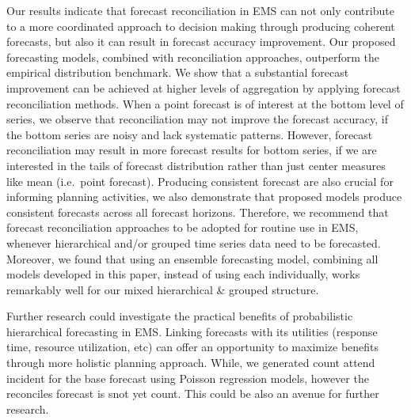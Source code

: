 \documentclass[
  authoryear,
  preprint,
  3p]{elsarticle}
\begin{document}
Our results indicate that forecast reconciliation in EMS can not only
contribute to a more coordinated approach to decision making through
producing coherent forecasts, but also it can result in forecast
accuracy improvement. Our proposed forecasting models, combined with
reconciliation approaches, outperform the empirical distribution
benchmark. We show that a substantial forecast improvement can be
achieved at higher levels of aggregation by applying forecast
reconciliation methods. When a point forecast is of interest at the
bottom level of series, we observe that reconciliation may not improve
the forecast accuracy, if the bottom series are noisy and lack
systematic patterns. However, forecast reconciliation may result in more
forecast results for bottom series, if we are interested in the tails of
forecast distribution rather than just center measures like mean
(i.e.~point forecast). Producing consistent forecast are also crucial
for informing planning activities, we also demonstrate that proposed
models produce consistent forecasts across all forecast horizons.
Therefore, we recommend that forecast reconciliation approaches to be
adopted for routine use in EMS, whenever hierarchical and/or grouped
time series data need to be forecasted. Moreover, we found that using an
ensemble forecasting model, combining all models developed in this
paper, instead of using each individually, works remarkably well for our
mixed hierarchical \& grouped structure.

Further research could investigate the practical benefits of
probabilistic hierarchical forecasting in EMS. Linking forecasts with
its utilities (response time, resource utilization, etc) can offer an
opportunity to maximize benefits through more holistic planning
approach. While, we generated count attend incident for the base
forecast using Poisson regression models, however the reconciles
forecast is snot yet count. This could be also an avenue for further
research.


\renewcommand\refname{References}
  
\end{document}
